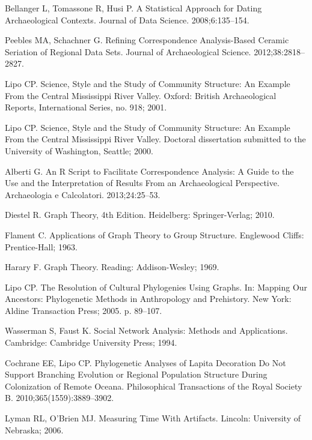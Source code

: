 \documentclass[10pt,letterpaper]{article}
\begin{document}
\begin{thebibliography}{10}
Bellanger L, Tomassone R, Husi P.
\newblock A Statistical Approach for Dating Archaeological Contexts.
\newblock Journal of Data Science. 2008;6:135--154.

Peebles MA, Schachner G.
\newblock Refining Correspondence Analysis-Based Ceramic Seriation of Regional
  Data Sets.
\newblock Journal of Archaeological Science. 2012;38:2818--2827.

Lipo CP.
\newblock Science, Style and the Study of Community Structure: An Example From
  the Central Mississippi River Valley.
\newblock Oxford: British Archaeological Reports, International Series, no.
  918; 2001.

Lipo CP.
\newblock Science, Style and the Study of Community Structure: An Example From
  the Central Mississippi River Valley.
\newblock Doctoral dissertation submitted to the University of Washington,
  Seattle; 2000.

Alberti G.
\newblock An R Script to Facilitate Correspondence Analysis: A Guide to the Use
  and the Interpretation of Results From an Archaeological Perspective.
\newblock Archaeologia e Calcolatori. 2013;24:25--53.

Diestel R.
\newblock Graph Theory, 4th Edition.
\newblock Heidelberg: Springer-Verlag; 2010.

Flament C.
\newblock Applications of Graph Theory to Group Structure.
\newblock Englewood Cliffs: Prentice-Hall; 1963.

Harary F.
\newblock Graph Theory.
\newblock Reading: Addison-Wesley; 1969.

Lipo CP.
\newblock The Resolution of Cultural Phylogenies Using Graphs.
\newblock In: Mapping Our Ancestors: Phylogenetic Methods in Anthropology and
  Prehistory. New York: Aldine Transaction Press; 2005. p. 89--107.

Wasserman S, Faust K.
\newblock Social Network Analysis: Methods and Applications.
\newblock Cambridge: Cambridge University Press; 1994.

Cochrane EE, Lipo CP.
\newblock Phylogenetic Analyses of Lapita Decoration Do Not Support Branching
  Evolution or Regional Population Structure During Colonization of Remote
  Oceana.
\newblock Philosophical Transactions of the Royal Society B.
  2010;365(1559):3889--3902.

Lyman RL, O'Brien MJ.
\newblock Measuring Time With Artifacts.
\newblock Lincoln: University of Nebraska; 2006.


\end{thebibliography}
\end{document}
